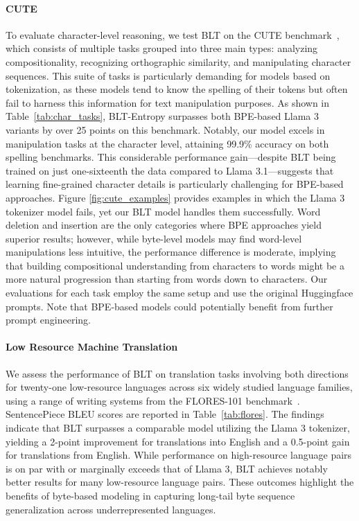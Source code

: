 \paragraph{CUTE}
To evaluate character-level reasoning, we test {\textsc BLT} on the CUTE benchmark~\citep{edman2024cute}, which consists of multiple tasks grouped into three main types: analyzing compositionality, recognizing orthographic similarity, and manipulating character sequences. This suite of tasks is particularly demanding for models based on tokenization, as these models tend to know the spelling of their tokens but often fail to harness this information for text manipulation purposes. As shown in Table~\ref{tab:char_tasks}, {\textsc BLT}-Entropy surpasses both BPE-based Llama 3 variants by over 25 points on this benchmark. Notably, our model excels in manipulation tasks at the character level, attaining 99.9\% accuracy on both spelling benchmarks. This considerable performance gain—despite {\textsc BLT} being trained on just one-sixteenth the data compared to Llama 3.1—suggests that learning fine-grained character details is particularly challenging for BPE-based approaches. Figure \ref{fig:cute_examples} provides examples in which the Llama 3 tokenizer model fails, yet our {\textsc BLT} model handles them successfully. Word deletion and insertion are the only categories where BPE approaches yield superior results; however, while byte-level models may find word-level manipulations less intuitive, the performance difference is moderate, implying that building compositional understanding from characters to words might be a more natural progression than starting from words down to characters. Our evaluations for each task employ the same setup and use the original Huggingface prompts. Note that BPE-based models could potentially benefit from further prompt engineering.

\paragraph{Low Resource Machine Translation} We assess the performance of {\textsc BLT} on translation tasks involving both directions for twenty-one low-resource languages across six widely studied language families, using a range of writing systems from the FLORES-101 benchmark~\citep{goyal2022flores}. SentencePiece BLEU scores are reported in Table~\ref{tab:flores}. The findings indicate that {\textsc BLT} surpasses a comparable model utilizing the Llama 3 tokenizer, yielding a 2-point improvement for translations into English and a 0.5-point gain for translations from English. While performance on high-resource language pairs is on par with or marginally exceeds that of Llama 3, {\textsc BLT} achieves notably better results for many low-resource language pairs. These outcomes highlight the benefits of byte-based modeling in capturing long-tail byte sequence generalization across underrepresented languages.

